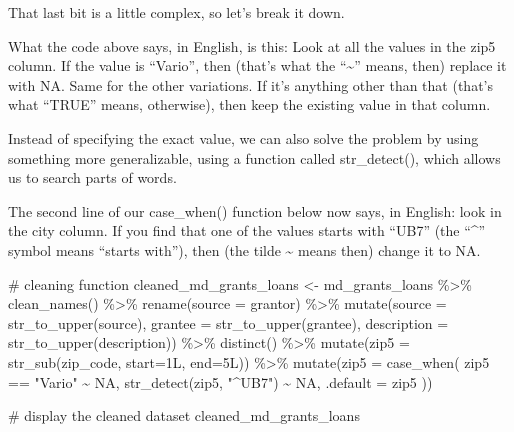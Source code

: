 \documentclass[
  letterpaper,
  DIV=11,
  numbers=noendperiod]{scrreprt}
\newenvironment{Shaded}{\begin{snugshade}}{\end{snugshade}}
\newcommand{\AttributeTok}[1]{\textcolor[rgb]{0.40,0.45,0.13}{#1}}
\newcommand{\CommentTok}[1]{\textcolor[rgb]{0.37,0.37,0.37}{#1}}
\newcommand{\ConstantTok}[1]{\textcolor[rgb]{0.56,0.35,0.01}{#1}}
\newcommand{\FunctionTok}[1]{\textcolor[rgb]{0.28,0.35,0.67}{#1}}
\newcommand{\NormalTok}[1]{\textcolor[rgb]{0.00,0.23,0.31}{#1}}
\newcommand{\OtherTok}[1]{\textcolor[rgb]{0.00,0.23,0.31}{#1}}
\newcommand{\SpecialCharTok}[1]{\textcolor[rgb]{0.37,0.37,0.37}{#1}}
\newcommand{\StringTok}[1]{\textcolor[rgb]{0.13,0.47,0.30}{#1}}
\begin{document}
That last bit is a little complex, so let's break it down.

What the code above says, in English, is this: Look at all the values in
the zip5 column. If the value is ``Vario'', then (that's what the
``\textasciitilde{}'' means, then) replace it with NA. Same for the
other variations. If it's anything other than that (that's what ``TRUE''
means, otherwise), then keep the existing value in that column.

Instead of specifying the exact value, we can also solve the problem by
using something more generalizable, using a function called
str\_detect(), which allows us to search parts of words.

The second line of our case\_when() function below now says, in English:
look in the city column. If you find that one of the values starts with
``UB7'' (the ``\^{}'' symbol means ``starts with''), then (the tilde
\textasciitilde{} means then) change it to NA.

\begin{Shaded}
\begin{Highlighting}[]
\CommentTok{\# cleaning function}
\NormalTok{cleaned\_md\_grants\_loans }\OtherTok{\textless{}{-}}\NormalTok{ md\_grants\_loans }\SpecialCharTok{\%\textgreater{}\%}
  \FunctionTok{clean\_names}\NormalTok{() }\SpecialCharTok{\%\textgreater{}\%} 
  \FunctionTok{rename}\NormalTok{(}\AttributeTok{source =}\NormalTok{ grantor) }\SpecialCharTok{\%\textgreater{}\%} 
  \FunctionTok{mutate}\NormalTok{(}\AttributeTok{source =} \FunctionTok{str\_to\_upper}\NormalTok{(source), }\AttributeTok{grantee =} \FunctionTok{str\_to\_upper}\NormalTok{(grantee), }\AttributeTok{description =} \FunctionTok{str\_to\_upper}\NormalTok{(description)) }\SpecialCharTok{\%\textgreater{}\%} 
  \FunctionTok{distinct}\NormalTok{() }\SpecialCharTok{\%\textgreater{}\%}
  \FunctionTok{mutate}\NormalTok{(}\AttributeTok{zip5 =} \FunctionTok{str\_sub}\NormalTok{(zip\_code, }\AttributeTok{start=}\NormalTok{1L, }\AttributeTok{end=}\NormalTok{5L)) }\SpecialCharTok{\%\textgreater{}\%}
  \FunctionTok{mutate}\NormalTok{(}\AttributeTok{zip5 =} \FunctionTok{case\_when}\NormalTok{(}
\NormalTok{    zip5 }\SpecialCharTok{==} \StringTok{"Vario"} \SpecialCharTok{\textasciitilde{}} \ConstantTok{NA}\NormalTok{,}
    \FunctionTok{str\_detect}\NormalTok{(zip5, }\StringTok{"\^{}UB7"}\NormalTok{) }\SpecialCharTok{\textasciitilde{}} \ConstantTok{NA}\NormalTok{,}
    \AttributeTok{.default =}\NormalTok{ zip5}
\NormalTok{  ))}

\CommentTok{\# display the cleaned dataset}
\NormalTok{cleaned\_md\_grants\_loans}
\end{Highlighting}
\end{Shaded}
\end{document}
